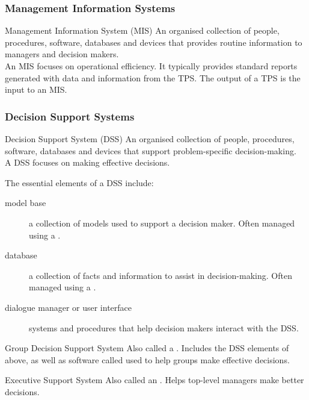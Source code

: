 \documentclass[\main/notes.tex]{subfiles}
\begin{document}
				\subsubsection{Management Information Systems}
					\begin{definition}{Management Information System (MIS)}
						An organised collection of people, procedures, software, databases and devices that provides routine information to managers and decision makers.\\
						An MIS focuses on operational efficiency. It typically provides standard reports generated with data and information from the TPS. The output of a TPS is the input to an MIS.
					\end{definition}
				\subsubsection{Decision Support Systems}
					\begin{definition}{Decision Support System (DSS)}
						An organised collection of people, procedures, software, databases and devices that support problem-specific decision-making.\\
						A DSS focuses on making effective decisions.
					\end{definition}
					The essential elements of a DSS include:
					\begin{indentparagraph}
						\begin{description}
							\item[model base] a collection of models used to support a decision maker. Often managed using a .
							\item[database] a collection of facts and information to assist in decision-making. Often managed using a .
							\item[dialogue manager or user interface] systems and procedures that help decision makers interact with the DSS.
						\end{description}
					\end{indentparagraph}
					\begin{definition}{Group Decision Support System}
						Also called a . Includes the DSS elements of above, as well as software called  used to help groups make effective decisions.
					\end{definition}
					\begin{definition}{Executive Support System}
						Also called an . Helps top-level managers make better decisions.
					\end{definition}
\end{document}
